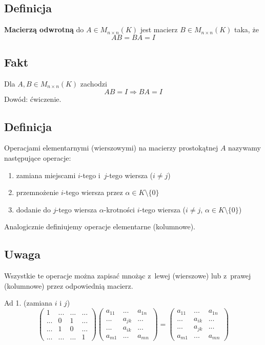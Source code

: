 \documentclass{article}
\begin{document}
  \subsection*{Definicja}
  \textbf{Macierzą odwrotną} do $A \in M_{n\times n}(K)$ jest macierz
  $B \in M_{n\times n}(K)$ taka, że
  \[AB = BA = I\]
  
  \subsection*{Fakt}
  Dla $A,B \in M_{n\times n}(K)$ zachodzi
  \[AB=I \Rightarrow BA=I\]
  Dowód: ćwiczenie.

  \subsection*{Definicja}
  Operacjami elementarnymi (wierszowymi) na macierzy prostokątnej $A$
  nazywamy następujące operacje:
  \begin{enumerate}
    \item zamiana miejscami $i$-tego i~$j$-tego wiersza ($i \neq j$)
    \item przemnożenie $i$-tego wiersza przez $\alpha \in K \setminus \{0\}$
    \item dodanie do $j$-tego wiersza $\alpha$-krotności $i$-tego wiersza
      ($i \neq j$, $\alpha \in K \setminus \{0\}$)
  \end{enumerate}
  Analogicznie definiujemy operacje elementarne (kolumnowe).

  \subsection*{Uwaga}
  Wszystkie te operacje można zapisać mnożąc z~lewej (wierszowe) lub
  z~prawej (kolumnowe) przez odpowiednią macierz.

  Ad 1. (zamiana $i$ i $j$)
  \[\begin{pmatrix}
     1 &...&...&...\\
    ...& 0 & 1 &...\\
    ...& 1 & 0 &...\\
    ...&...&...& 1
  \end{pmatrix}\begin{pmatrix}
    a_{11}&...&a_{1n}\\
    ...&a_{jk}&...\\
    ...&a_{ik}&...\\
    a_{m1}&...&a_{mn}
  \end{pmatrix}=\begin{pmatrix}
    a_{11}&...&a_{1n}\\
    ...&a_{ik}&...\\
    ...&a_{jk}&...\\
    a_{m1}&...&a_{mn}
  \end{pmatrix}\]
\end{document}

